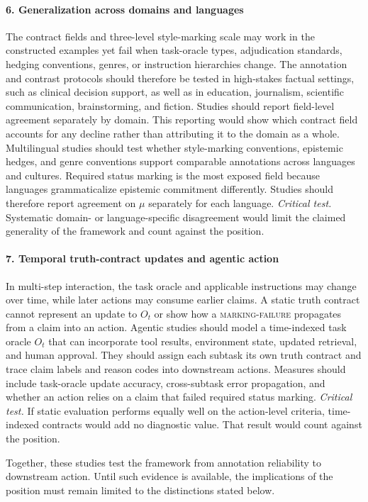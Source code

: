 \documentclass{clv2025}
\begin{document}
\paragraph{6. Generalization across domains and languages}
The contract fields and three-level style-marking scale may work in the
constructed examples yet fail when task-oracle types, adjudication standards,
hedging conventions, genres, or instruction hierarchies change.
The annotation and contrast protocols should therefore be tested in
high-stakes factual settings, such as clinical decision support, as well as in
education, journalism, scientific communication, brainstorming, and fiction.
Studies should report field-level agreement separately by domain. This
reporting would show which contract field accounts for any decline rather than
attributing it to the domain as a whole.
Multilingual studies should test whether style-marking conventions, epistemic
hedges, and genre conventions support comparable annotations across languages
and cultures. Required status marking is the most exposed field because
languages grammaticalize epistemic commitment differently. Studies should
therefore report agreement on $\mu$ separately for each language.
\emph{Critical test.} Systematic domain- or language-specific disagreement
would limit the claimed generality of the framework and count against the
position.

\paragraph{7. Temporal truth-contract updates and agentic action}
In multi-step interaction, the task oracle and applicable instructions may
change over time, while later actions may consume earlier claims.
A static truth contract cannot represent an update to $O_t$ or show how a
\textsc{marking-failure} propagates from a claim into an action.
Agentic studies should model a time-indexed task oracle $O_t$ that can
incorporate tool results, environment state, updated retrieval, and human
approval.
They should assign each subtask its own truth contract and trace claim labels
and reason codes into downstream actions.
Measures should include task-oracle update accuracy, cross-subtask error
propagation, and whether an action relies on a claim that failed required
status marking.
\emph{Critical test.} If static evaluation performs equally well on the
action-level criteria, time-indexed contracts would add no diagnostic value.
That result would count against the position.


Together, these studies test the framework from annotation reliability to
downstream action. Until such evidence is available, the implications of the
position must remain limited to the distinctions stated below.
\end{document}
